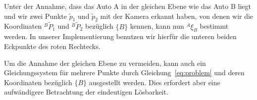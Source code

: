 Unter der Annahme, dass das Auto A in der gleichen Ebene wie das Auto B liegt und wir zwei Punkte $\tilde{p}_1$ und $\tilde{p}_2$ mit der Kamera erkannt haben, von denen wir die Koordinaten $^B\tilde{P}_1$ und $^B\tilde{P}_2$ bezüglich $\{B\}$ kennen, kann nun $^A\xi_B$ bestimmt werden. In unserer Implementierung benutzen wir hierfür die unteren beiden Eckpunkte des roten Rechtecks.

Um die Annahme der gleichen Ebene zu vermeiden, kann auch ein Gleichungssystem für mehrere Punkte durch Gleichung~\ref{eq:problem} und deren Koordinaten bezüglich $\{B\}$ ausgestellt werden. Dies erfordert aber eine aufwändigere Betrachtung der eindeutigen Lösbarkeit.

